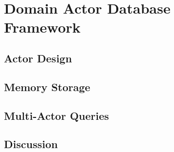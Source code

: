 
\section{Domain Actor Database Framework}\label{sec:framework}
\subsection{Actor Design}

\subsection{Memory Storage}

\subsection{Multi-Actor Queries}

\subsection{Discussion}
